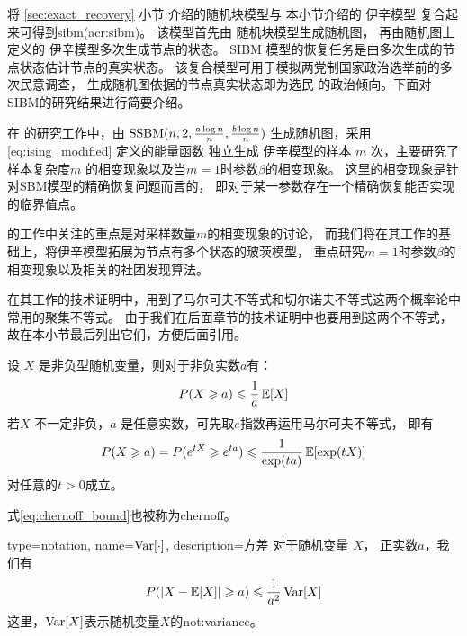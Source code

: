 将 \ref{sec:exact_recovery} 小节 介绍的随机块模型与 本小节介绍的 伊辛模型
复合起来可得到\gls{sibm}(\gls{acr:sibm})\cite{ye2020exact}。
该模型首先由 随机块模型生成随机图，
再由随机图上定义的 伊辛模型多次生成节点的状态。
SIBM 模型的恢复任务是由多次生成的节点状态估计节点的真实状态。
该复合模型可用于模拟两党制国家政治选举前的多次民意调查，
生成随机图依据的节点真实状态即为选民
的政治倾向。下面对SIBM的研究结果进行简要介绍。

在\citet{ye2020exact} 的研究工作中，由 $\operatorname{SSBM}(n,2,\frac{a \log n}{n}, \frac{b \log n}{n})$
生成随机图，采用 \eqref{eq:ising_modified} 定义的能量函数
独立生成 伊辛模型的样本 $m$ 次，主要研究了样本复杂度$m$
的相变现象以及当$m=1$时参数$\beta$的相变现象。
这里的相变现象是针对SBM模型的精确恢复问题而言的，
即对于某一参数存在一个精确恢复能否实现的临界值点。

\citet{ye2020exact} 的工作中关注的重点是对采样数量$m$的相变现象的讨论，
而我们将在其工作的基础上，将伊辛模型拓展为节点有多个状态的玻茨模型，
重点研究$m=1$时参数$\beta$的相变现象以及相关的社团发现算法。

\citet{ye2020exact} 在其工作的技术证明中，用到了马尔可夫不等式和切尔诺夫不等式这两个概率论中常用的聚集不等式。
由于我们在后面章节的技术证明中也要用到这两个不等式，故在本小节最后列出它们，方便后面引用。

\begin{lemma} 
  设 $X$ 是非负型随机变量，则对于非负实数$a$有：
  \begin{equation}
    P(X\geqslant a) \leqslant {1 \over a} \operatorname{\mathbb{E}}[X]   
  \end{equation}
   若$X$ 不一定非负，$a$ 是任意实数，可先取$e$指数再运用马尔可夫不等式，
   即有
   \begin{equation}\label{eq:chernoff_bound}
    P(X\geqslant a) = P(e^{tX} \geqslant e^{ta}) \leqslant { 1 \over \exp(ta)} \operatorname{\mathbb{E}}[\exp(tX)]
   \end{equation}
   对任意的$t>0$成立。

   式\eqref{eq:chernoff_bound}也被称为\gls{chernoff}。
\end{lemma}
\begin{lemma}
{
  type=notation,
  name={$\operatorname{\mathrm{Var}}[\cdot]$},
  description={方差}
}
  对于随机变量 $X$， 正实数$a$，我们有
  \begin{equation}
    P(\lvert X-\operatorname{\mathbb{E}}[X]\rvert \geqslant a) \leqslant {1 \over a^2} \operatorname{\mathrm{Var}}[X]
  \end{equation}
  这里，$\operatorname{\mathrm{Var}}[X]$表示随机变量$X$的\glsdesc{not:variance}。
\end{lemma}

